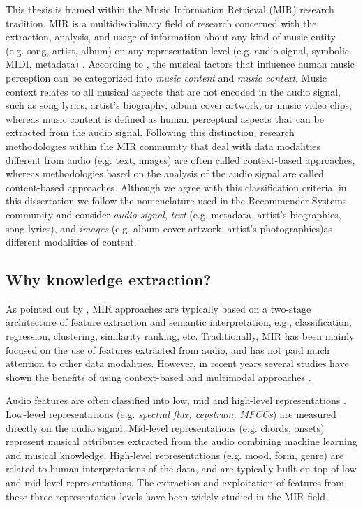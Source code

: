This thesis is framed within the Music Information Retrieval (MIR) research tradition. 
MIR is a multidisciplinary field of research concerned with the extraction, analysis, and usage of information about any kind of music entity (e.g. song, artist, album) on any representation level (e.g. audio signal, symbolic MIDI, metadata) \citep{schedl2008}. According to \cite{Schedl2013}, the musical factors that influence human music perception can be categorized into \textit{music content} and \textit{music context}.%
Music context relates to all musical aspects that are not encoded in the audio signal, such as song lyrics, artist's biography, album cover artwork, or music video clips, whereas music content is defined as human perceptual aspects that can be extracted from the audio signal. %
Following this distinction, research methodologies within the MIR community that deal with data modalities different from audio (e.g. text, images) are often called context-based approaches, whereas methodologies based on the analysis of the audio signal are called content-based approaches. 
Although we agree with this classification criteria, in this dissertation we follow the nomenclature used in the Recommender Systems community \citep{Ostuni2013} and consider \textit{audio signal}, \textit{text} (e.g. metadata, artist's biographies, song lyrics), and \textit{images} (e.g. album cover artwork, artist's photographies)as different modalities of content.

\subsection{Why knowledge extraction?}
\label{sec:intro:nlp}

As pointed out by \cite{humphrey2012}, MIR approaches are typically based on a two-stage architecture of feature extraction and semantic interpretation, e.g., classification, regression, clustering, similarity ranking, etc. 
Traditionally, MIR has been mainly focused on the use of features extracted from audio, and has not paid much attention to other data modalities. However, in recent years several studies have shown the benefits of using context-based and multimodal approaches \citep{Schedl2014}. 

Audio features are often classified into low, mid and high-level representations \citep{bello2005}. Low-level representations (e.g. \textit{spectral flux, cepstrum, MFCCs}) are measured directly on the audio signal. Mid-level representations (e.g. chords, onsets) represent musical attributes extracted from the audio combining machine learning and musical knowledge. High-level representations (e.g. mood, form, genre) are related to human interpretations of the data, and are typically built on top of low and mid-level representations. The extraction and exploitation of features from these three representation levels have been widely studied in the MIR field. 

